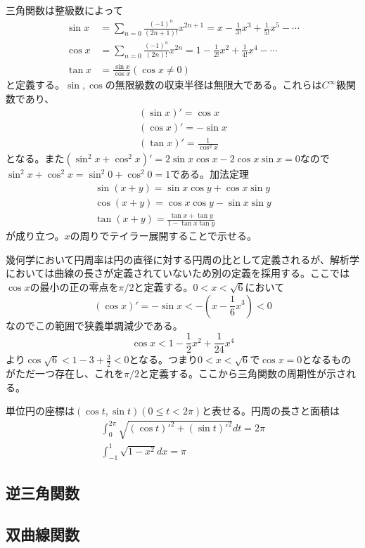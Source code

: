 三角関数は整級数によって
\begin{align*}
	\sin x &= \sum_{n = 0} \frac{(-1)^n}{(2n + 1)!}x^{2n + 1} = x - \frac{1}{3!}x^3 + \frac{1}{5!}x^5 - \cdots\\
	\cos x &= \sum_{n = 0} \frac{(-1)^n}{(2n)!}x^{2n} = 1 - \frac{1}{2!}x^2 + \frac{1}{4!}x^4 - \cdots\\
	\tan x &= \frac{\sin x}{\cos x} (\cos x \neq 0)
\end{align*}
と定義する。$\sin, \cos$の無限級数の収束半径は無限大である。これらは$C^\infty$級関数であり、
\begin{align*}
	(\sin x)' = \cos x\\
	(\cos x)' = -\sin x\\
	(\tan x)' = \frac{1}{\cos^2 x}
\end{align*}
となる。また$(\sin^2 x + \cos^2 x)' = 2\sin x\cos x - 2\cos x\sin x = 0$なので$\sin^2 x + \cos^2 x = \sin^2 0 + \cos^2 0 = 1$である。加法定理
\begin{align*}
	\sin(x + y) = \sin x\cos y + \cos x\sin y\\
	\cos(x + y) = \cos x\cos y - \sin x\sin y\\
	\tan(x + y) = \frac{\tan x + \tan y}{1 - \tan x\tan y}
\end{align*}
が成り立つ。$x$の周りでテイラー展開することで示せる。

幾何学において円周率は円の直径に対する円周の比として定義されるが、解析学においては曲線の長さが定義されていないため別の定義を採用する。ここでは$\cos x$の最小の正の零点を$\pi/2$と定義する。$0 < x < \sqrt{6}$において
	\[(\cos x)' = -\sin x < - (x - \frac{1}{6}x^3) < 0\]
なのでこの範囲で狭義単調減少である。
	\[\cos x < 1 - \frac{1}{2}x^2 + \frac{1}{24}x^4\]
より$\cos \sqrt{6} < 1 - 3 + \frac{3}{2} < 0$となる。つまり$0 < x < \sqrt{6}$で$\cos x = 0$となるものがただ一つ存在し、これを$\pi/2$と定義する。ここから三角関数の周期性が示される。

単位円の座標は$(\cos t, \sin t)(0 \leq t < 2\pi)$と表せる。円周の長さと面積は
\begin{align*}
	\int_0^{2\pi} \sqrt{(\cos t)'^2 + (\sin t)'^2}dt = 2\pi\\
	\int_{-1}^1 \sqrt{1 - x^2}dx = \pi
\end{align*}

\subsection{逆三角関数}
\subsection{双曲線関数}